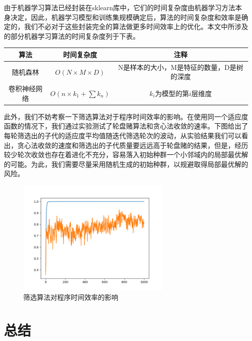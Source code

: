 \documentclass[UTF8,a4paper,10pt]{ctexart}
\begin{document}
    由于机器学习算法已经封装在sklearn库中，它们的时间复杂度由机器学习方法本身决定，因此，机器学习模型和训练集规模确定后，算法的时间复杂度和效率是确定的，我们不必对于这些封装完全的算法做更多时间效率上的优化。本文中所涉及的部分机器学习算法的时间复杂度列于下表。
    \begin{center}
        \begin{tabular}{ccc}
            \toprule
            算法&时间复杂度&注释\\
            \midrule
            随机森林&$O(N\times M\times D)$&N是样本的大小，M是特征的数量，D是树的深度\\
            卷积神经网络&$O(n\times k_1 + \sum k_n)$&$k_i$为模型的第$i$层维度\\
            \bottomrule
        \end{tabular}
    \end{center}
    此外，我们不妨考察一下筛选算法对于程序时间效率的影响。在使用同一个适应度函数的情况下，我们通过实验测试了轮盘赌算法和贪心法收敛的速率。下图给出了每轮筛选出的子代的适应度平均值随迭代筛选轮次的波动，从实验结果我们可以看出，贪心法收敛的速度和筛选出的子代质量要远远高于轮盘赌的结果，但是，经历较少轮次收敛也存在着进化不充分，容易落入初始种群一个小邻域内的局部最优解的可能。为此，我们需要尽量采用随机生成的初始种群，以规避取得局部最优解的风险。

    \begin{figure}[H]
        \centering
        \includegraphics[width=3in]{compare.png}
        \caption{筛选算法对程序时间效率的影响}
        \label{}
    \end{figure}

    \section{\textcolor[rgb]{0,0.3,0.6}{总结}}
\end{document}

